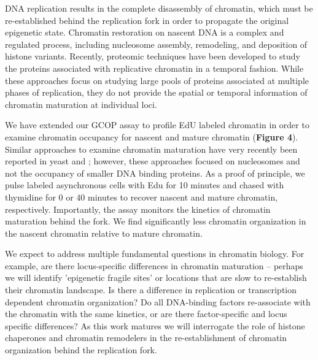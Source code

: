 DNA replication results in the complete disassembly of chromatin, which must be re-established behind the replication fork in order to propagate the original epigenetic state. Chromatin restoration on nascent DNA is a complex and regulated process, including nucleosome assembly, remodeling, and deposition of histone variants\citep{MacAlpine2013-ds}.  Recently, proteomic techniques have been developed to study the proteins associated with replicative chromatin in a temporal fashion\citep{Alabert2014-io,Sirbu2011-wx}. %
While these approaches focus on studying large pools of proteins associated at multiple phases of replication, they do not provide the spatial or temporal information of chromatin maturation at individual loci. 

We have extended our GCOP assay to profile EdU labeled chromatin in order to examine chromatin occupancy for nascent and mature chromatin ({\color{dukeblue}\textbf{Figure 4}}).  Similar approaches to examine chromatin maturation have very recently been reported in yeast\citep{Vasseur2016-rx} and \dros\citep{Ramachandran2016-zu}; however, these approaches focused on nucleosomes and not the occupancy of smaller DNA binding proteins.  As a proof of principle, we pulse labeled asynchronous cells with Edu for 10 minutes and chased with thymidine for 0 or 40 minutes to recover nascent and mature chromatin, respectively.  Importantly, the  assay monitors the kinetics of chromatin maturation behind the fork. We find significantly less chromatin organization in the nascent chromatin relative to mature chromatin. %

We expect to address multiple fundamental questions in chromatin biology. For example, are there locus-specific differences in chromatin maturation -- perhaps we will identify 'epigenetic fragile sites' or locations that are slow to re-establish their chromatin landscape. Is there a difference in replication or transcription dependent chromatin organization? Do all DNA-binding factors re-associate with the chromatin with the same kinetics, or are there factor-specific and locus specific differences?   As this work matures we will interrogate the role of histone chaperones and chromatin remodelers in the re-establishment of chromatin organization behind the replication fork.  







